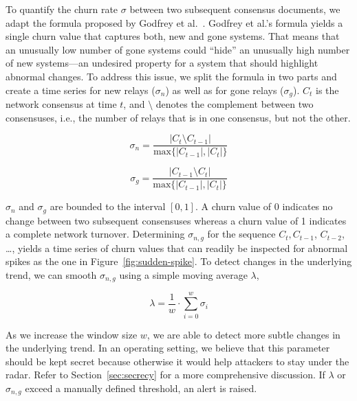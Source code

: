 To quantify the churn rate $\sigma$ between two subsequent consensus documents,
we adapt the formula proposed by Godfrey et al.~\cite{Godfrey2006a}.  Godfrey et
al.'s formula yields a single churn value that captures both, new and gone
systems.  That means that an unusually low number of gone systems could ``hide''
an unusually high number of new systems---an undesired property for a system
that should highlight abnormal changes.  To address this issue, we split the
formula in two parts and create a time series for new relays ($\sigma_{n}$) as
well as for gone relays ($\sigma_{g}$).  $C_{t}$ is the network consensus at
time $t$, and $\setminus$ denotes the complement between two consensuses, i.e.,
the number of relays that is in one consensus, but not the other.

\begin{equation}
\sigma_{n} = \frac{\lvert C_{t} \setminus C_{t-1} \rvert}
{\textrm{max}\{\lvert C_{t-1} \rvert, \lvert C_{t} \rvert \}}
\end{equation}

\begin{equation}
\sigma_{g} = \frac{\lvert C_{t-1} \setminus C_{t} \rvert}
{\textrm{max}\{\lvert C_{t-1} \rvert, \lvert C_{t} \rvert \}}
\end{equation}

$\sigma_{n}$ and $\sigma_{g}$ are bounded to the interval $[0, 1]$.  A churn
value of 0 indicates no change between two subsequent consensuses whereas a
churn value of 1 indicates a complete network turnover.  Determining
$\sigma_{n,g}$ for the sequence $C_{t}, C_{t-1}$, $C_{t-2}$, \ldots, yields a
time series of churn values that can readily be inspected for abnormal spikes as
the one in Figure~\ref{fig:sudden-spike}.  To detect changes in the underlying
trend, we can smooth $\sigma_{n,g}$ using a simple moving average $\lambda$,

\begin{equation}
\lambda = \frac{1}{w} \cdot \sum_{i=0}^{w} \sigma_{i}
\end{equation}

As we increase the window size $w$, we are able to detect more subtle changes in
the underlying trend.  In an operating setting, we believe that this parameter
should be kept secret because otherwise it would help attackers to stay under
the radar.  Refer to Section~\ref{sec:secrecy} for a more comprehensive
discussion.  If $\lambda$ or $\sigma_{n,g}$ exceed a manually defined threshold,
an alert is raised.


